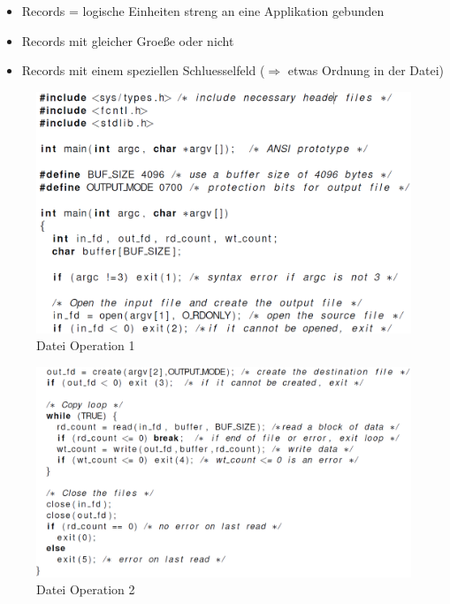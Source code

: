 \documentclass[a4paper]{scrreprt}
\begin{document}
\begin{itemize}
	\item Records = logische Einheiten streng an eine Applikation gebunden
	\item Records mit gleicher Groeße oder nicht
	\item Records mit einem speziellen Schluesselfeld ($\Rightarrow$ etwas Ordnung in der Datei)
\end{itemize}

\begin{figure}[ht]
\centering
\includegraphics[scale=0.4]{graphics/file_operation.png}
\caption{Datei Operation 1}
\end{figure}

\begin{figure}[ht]
\centering
\includegraphics[scale=0.4]{graphics/file_operation2.png}
\caption{Datei Operation 2}
\end{figure}
\end{document}
